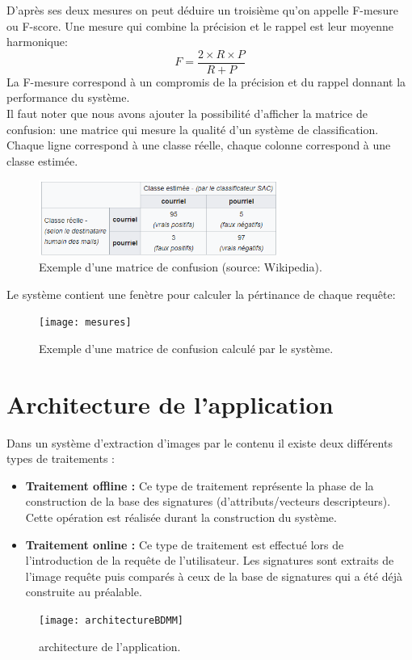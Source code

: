 D'après ses deux mesures on peut déduire un troisième qu'on appelle F-mesure ou F-score. Une mesure qui combine la précision et le rappel est leur moyenne harmonique:
\begin{equation}
F = \frac{2\times R\times P}{R + P} 
\end{equation}
La F-mesure correspond à un compromis de la précision et du rappel donnant la performance du système.\\

Il faut noter que nous avons ajouter la possibilité d'afficher la matrice de confusion: une matrice qui mesure la qualité d'un système de classification. Chaque ligne correspond à une classe réelle, chaque colonne correspond à une classe estimée. 
\begin{figure}[H]
	\centering
	\includegraphics[width=0.7\textwidth]{Figures/cm.png} 
	\caption{Exemple d'une matrice de confusion (source: Wikipedia).}
\end{figure}
Le système contient une fenètre pour calculer la pértinance de chaque requête:
\begin{figure}[H]
	\centering
	\texttt{[image: mesures]} 
	\caption{Exemple d'une matrice de confusion calculé par le système.}
\end{figure}
\section{Architecture de l’application}
Dans un système d’extraction d’images par le contenu il existe deux différents types de traitements :
\begin{itemize}
	\item \textbf{Traitement offline :}
	Ce type de traitement représente la phase de la construction de la base des signatures (d’attributs/vecteurs descripteurs).
	Cette opération est réalisée durant la construction du système.
	\item \textbf{Traitement online :}
	Ce type de traitement est effectué lors de l’introduction de la requête de l’utilisateur.
	Les signatures sont extraits de l’image requête puis comparés à ceux de la base de signatures qui a été déjà construite au préalable.
\end{itemize}
\begin{figure}[H]
	\centering
	\texttt{[image: architectureBDMM]} 
	\caption{architecture de l’application.}
\end{figure}

